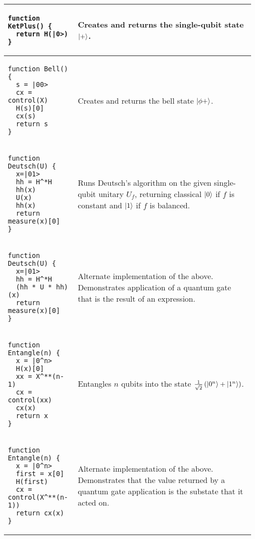 \documentclass{article}
\begin{document}
\begin{center}
\begin{tabular}{| l | m{8cm} |}
\hline
\begin{lstlisting}
function KetPlus() {
  return H(|0>)
}
\end{lstlisting} & Creates and returns the single-qubit state $\ket +$. \\ \hline
\begin{lstlisting}
function Bell() {
  s = |00>
  cx = control(X)
  H(s)[0]
  cx(s)
  return s
}
\end{lstlisting} & Creates and returns the bell state $\ket{\phi +}$. \\ \hline
\begin{lstlisting}
function Deutsch(U) {
  x=|01>
  hh = H^*H
  hh(x)
  U(x)
  hh(x)
  return measure(x)[0]
}
\end{lstlisting} & Runs Deutsch’s algorithm on the given single-qubit unitary $U_f$, returning classical $\ket 0$ if $f$ is constant and $\ket 1$ if $f$ is balanced. \\ \hline
\begin{lstlisting}
function Deutsch(U) {
  x=|01>
  hh = H^*H
  (hh * U * hh)(x)
  return measure(x)[0]
}
\end{lstlisting} & Alternate implementation of the above. Demonstrates application of a quantum gate that is the result of an expression. \\ \hline
\begin{lstlisting}
function Entangle(n) {
  x = |0^n>
  H(x)[0]
  xx = X^**(n-1)
  cx = control(xx)
  cx(x)
  return x
}
\end{lstlisting} & Entangles $n$ qubits into the state $\frac{1}{\sqrt 2}\left(\ket{0^n}+\ket{1^n}\right)$. \\ \hline
\begin{lstlisting}
function Entangle(n) {
  x = |0^n>
  first = x[0]
  H(first)
  cx = control(X^**(n-1))
  return cx(x)
}
\end{lstlisting} & Alternate implementation of the above. Demonstrates that the value returned by a quantum gate application is the substate that it acted on. \\ \hline

\end{tabular}
\end{center}
\end{document}
